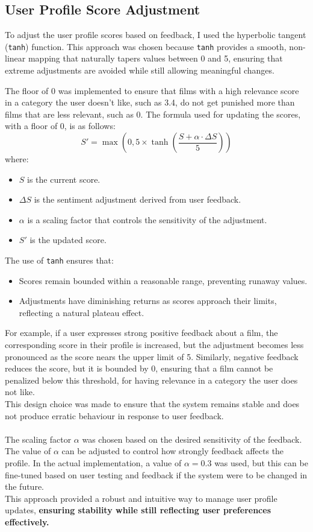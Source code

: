 \subsection{User Profile Score Adjustment}
\label{subsec:user_profile_score_adjustment}

To adjust the user profile scores based on feedback, I used the hyperbolic tangent (\texttt{tanh}) function. 
This approach was chosen because \texttt{tanh} provides a smooth, non-linear mapping that naturally tapers values between 0 and 5, ensuring that extreme adjustments are avoided while still allowing meaningful changes.

The floor of 0 was implemented to ensure that films with a high relevance score in a category the user doesn't like, such as 3.4, do not get punished more than films that are less relevant, such as 0.
The formula used for updating the scores, with a floor of 0, is as follows:
\[
S' = \max\left(0, 5 \times \tanh\left(\frac{S + \alpha \cdot \Delta S}{5}\right)\right)
\]
where:
\begin{itemize}
    \item \( S \) is the current score.
    \item \( \Delta S \) is the sentiment adjustment derived from user feedback.
    \item \( \alpha \) is a scaling factor that controls the sensitivity of the adjustment.
    \item \( S' \) is the updated score.
\end{itemize}

The use of \texttt{tanh} ensures that:
\begin{itemize}
    \item Scores remain bounded within a reasonable range, preventing runaway values.
    \item Adjustments have diminishing returns as scores approach their limits, reflecting a natural plateau effect.
\end{itemize}

For example, if a user expresses strong positive feedback about a film, the corresponding score in their profile is increased, but the adjustment becomes less pronounced as the score nears the upper limit of 5. 
Similarly, negative feedback reduces the score, but it is bounded by 0, ensuring that a film cannot be penalized below this threshold, for having relevance in a category the user does not like.
\\
This design choice was made to ensure that the system remains stable and does not produce erratic behaviour in response to user feedback.
\\\\
The scaling factor \( \alpha \) was chosen based on the desired sensitivity of the feedback.
The value of \( \alpha \) can be adjusted to control how strongly feedback affects the profile. 
In the actual implementation, a value of \( \alpha = 0.3 \) was used, but this can be fine-tuned based on user testing and feedback if the system were to be changed in the future.
\\
This approach provided a robust and intuitive way to manage user profile updates, \textbf{ensuring stability while still reflecting user preferences effectively.}

